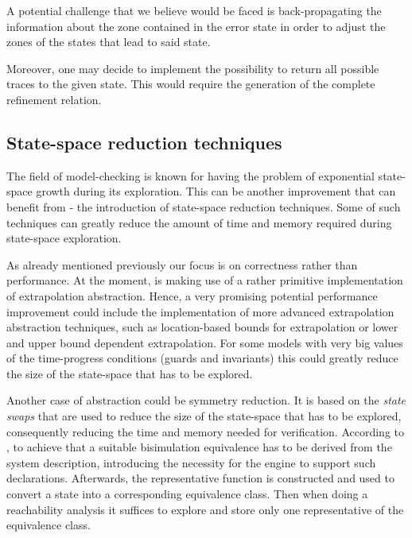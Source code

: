 A potential challenge that we believe would be faced is back-propagating the information about the zone contained in the error state in order to adjust the zones of the states that lead to said state.

Moreover, one may decide to implement the possibility to return all possible traces to the given state. This would require the generation of the complete refinement relation.

\subsection{State-space reduction techniques}
The field of model-checking is known for having the problem of exponential state-space growth during its exploration.
This can be another improvement that \jecdar can benefit from - the introduction of state-space reduction techniques. Some of such techniques can greatly reduce the amount of time and memory required during state-space exploration.

As already mentioned previously our focus is on correctness rather than performance. At the moment, \jecdar is making use of a rather primitive implementation of extrapolation abstraction. Hence, a very promising potential performance improvement could include the implementation of more advanced extrapolation abstraction techniques, such as location-based bounds for extrapolation or lower and upper bound dependent extrapolation. For some models with very big values of the time-progress conditions (guards and invariants) this could greatly reduce the size of the state-space that has to be explored.

Another case of abstraction could be symmetry reduction. It is based on the \textit{state swaps} that are used to reduce the size of the state-space that has to be explored, consequently reducing the time and memory needed for verification. According to \textcite{SymmetryReduction}, to achieve that a suitable bisimulation equivalence has to be derived from the system description, introducing the necessity for the engine to support such declarations. Afterwards, the representative function is constructed and used to convert a state into a corresponding equivalence class. Then when doing a reachability analysis it suffices to explore and store only one representative of the equivalence class.
